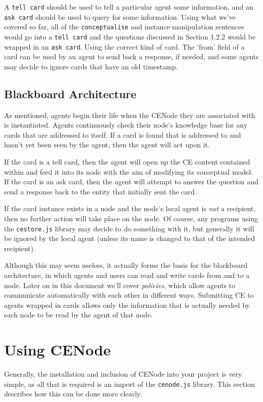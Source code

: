 \documentclass{article}
\begin{document}
A \texttt{tell card} should be used to tell a particular agent some information, and an \texttt{ask card} should be used to query for some information. Using what we've covered so far, all of the \texttt{conceptualise} and instance-manipulation sentences would go into a \texttt{tell card} and the questions discussed in Section 1.2.2 would be wrapped in an \texttt{ask card}. Using the correct kind of card. The 'from' field of a card can be used by an agent to send back a response, if needed, and some agents may decide to ignore cards that have an old timestamp. 


\subsection{Blackboard Architecture}

As mentioned, agents begin their life when the CENode they are associated with is instantiated. Agents continuously check their node's knowledge base for any cards that are addressed to itself. If a card is found that is addressed to and hasn't yet been seen by the agent, then the agent will act upon it.

If the card is a tell card, then the agent will open up the CE content contained within and feed it into its node with the aim of modifying its conceptual model. If the card is an ask card, then the agent will attempt to answer the question and send a response back to the entity that initially sent the card.

If the card instance exists in a node and the node's local agent is \textit{not} a recipient, then no further action will take place on the node. Of course, any programs using the \texttt{cestore.js} library may decide to do something with it, but generally it will be ignored by the local agent (unless its name is changed to that of the intended recipient). 

Although this may seem useless, it actually forms the basis for the blackboard architecture, in which agents and users can read and write cards from and to a node. Later on in this document we'll cover \textit{policies}, which allow agents to communicate automatically with each other in different ways. Submitting CE to agents wrapped in cards allows only the information that is actually needed by each node to be read by the agent of that node.


\section{Using CENode}
Generally, the installation and inclusion of CENode into your project is very simple, as all that is required is an import of the \texttt{cenode.js} library. This section describes how this can be done more clearly.
\end{document}
